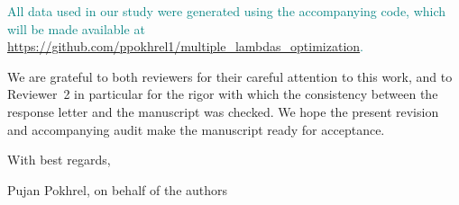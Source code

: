 \documentclass{article}
\newenvironment{answered}{\par\normalfont}{}
\newcommand{\rthree}[1]{\textcolor{teal}{#1}}    %
\begin{document}
\begin{answered}
\rthree{All data used in our study were generated using the accompanying code,
which will be made available at
\url{https://github.com/ppokhrel1/multiple_lambdas_optimization}.}
\end{answered}

\bigskip

\noindent We are grateful to both reviewers for their careful attention to
this work, and to Reviewer~2 in particular for the rigor with which the
consistency between the response letter and the manuscript was checked. We
hope the present revision and accompanying audit make the manuscript ready
for acceptance.

\bigskip

\noindent With best regards,

\medskip

\noindent Pujan Pokhrel, on behalf of the authors

\printbibliography
\end{document}
